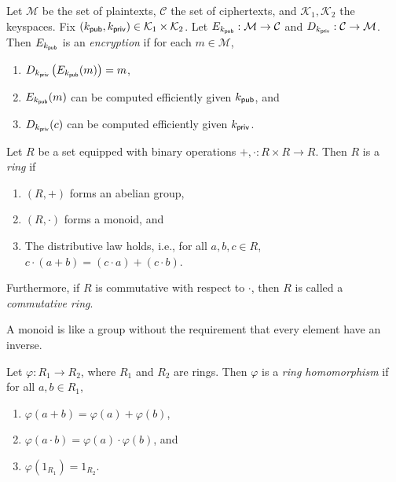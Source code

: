 \documentclass[10pt,reqno]{article}
\begin{document}
\begin{definition}[Encryption]\label{def:encryption}
    Let $\mathcal{M}$ be the set of plaintexts, $\mathcal{C}$ the set of ciphertexts, and $\mathcal{K}_1,\mathcal{K}_2$ the keyspaces. Fix $\left(k_{\sf{pub}},k_{\sf{priv}}\right) \in \mathcal{K}_1\times\mathcal{K}_2$. Let $E_{k_{\sf{pub}}}: \mathcal{M} \to \mathcal{C}$ and $D_{k_{\sf{priv}}}: \mathcal{C} \to \mathcal{M}$. Then $E_{k_{\sf{pub}}}$ is an \emph{encryption} if for each $m \in \mathcal{M}$, 
    \begin{enumerate}[label=(\roman*)]
        \item $D_{k_{\sf{priv}}}\left(E_{k_{\sf{pub}}}(m)\right)=m$,
        \item $E_{k_{\sf{pub}}}(m)$ can be computed efficiently given $k_{\sf{pub}}$, and
        \item $D_{k_{\sf{priv}}}(c)$ can be computed efficiently given $k_{\sf{priv}}$.
    \end{enumerate}
\end{definition}


\begin{definition}[Ring]\label{def:ring}
    Let $R$ be a set equipped with binary operations $+,\cdot:R \times R \to R$. Then $R$ is a \emph{ring} if
    \begin{enumerate}[label=(\roman*)]
        \item $(R,+)$ forms an abelian group,
        \item $(R,\cdot)$ forms a monoid, and
        \item The distributive law holds, i.e., for all $a,b,c \in R$, $c\cdot  (a+b)=(c \cdot a)+(c \cdot b)$.
    \end{enumerate}
    Furthermore, if $R$ is commutative with respect to $\cdot$, then $R$ is called a \emph{commutative ring}.  
\end{definition}

\begin{remark*}
A monoid is like a group without the requirement that every element have an inverse.
\end{remark*}


\begin{definition}\label{def:homomorphism}
    Let $\varphi: R_1 \to R_2$, where $R_1$ and $R_2$ are rings. Then $\varphi$ is a \emph{ring homomorphism} if for all $a,b \in R_1$,
    \begin{enumerate}[label=(\roman*)]
        \item $\varphi(a + b) = \varphi(a) + \varphi(b)$,
        \item $\varphi(a \cdot b) = \varphi(a) \cdot \varphi(b)$, and
        \item $\varphi(1_{R_1}) = 1_{R_2}$.
    \end{enumerate}
\end{definition}
\end{document}
